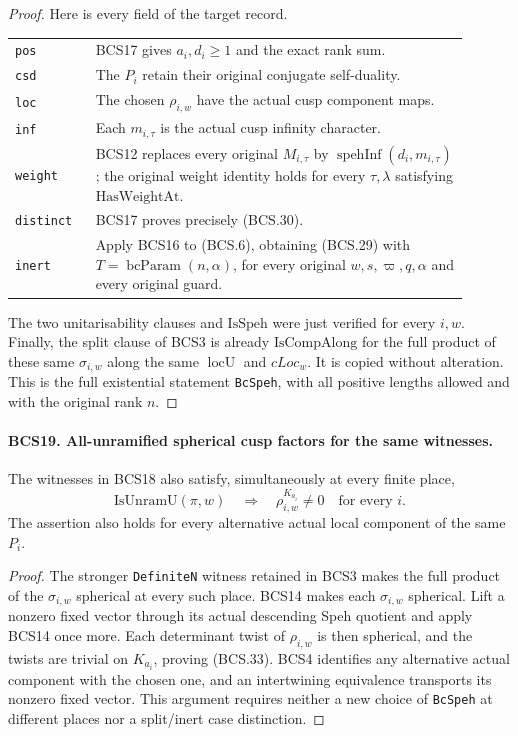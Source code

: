 \begin{proof}
Here is every field of the target record.
\begin{center}
\begin{tabular}{p{0.16\linewidth}p{0.74\linewidth}}
\texttt{pos} & BCS17 gives \(a_i,d_i\ge1\) and the exact rank sum.\\
\texttt{csd} & The \(P_i\) retain their original conjugate self-duality.\\
\texttt{loc} & The chosen \(\rho_{i,w}\) have the actual cusp component maps.\\
\texttt{inf} & Each \(m_{i,\tau}\) is the actual cusp infinity character.\\
\texttt{weight} & BCS12 replaces every original \(M_{i,\tau}\) by
\(\operatorname{spehInf}(d_i,m_{i,\tau})\); the original weight
identity holds for every \(\tau,\lambda\) satisfying
\(\mathrm{HasWeightAt}\).\\
\texttt{distinct} & BCS17 proves precisely (BCS.30).\\
\texttt{inert} & Apply BCS16 to (BCS.6), obtaining (BCS.29) with
\(T=\operatorname{bcParam}(n,\alpha)\), for every original
\(w,s,\varpi,q,\alpha\) and every original guard.\\
\end{tabular}
\end{center}
The two unitarisability clauses and \(\mathrm{IsSpeh}\) were just
verified for every \(i,w\).  Finally, the split clause of BCS3 is
already \(\mathrm{IsCompAlong}\) for the full product of these
same \(\sigma_{i,w}\) along the same \(\operatorname{locU}\)
and \(cLoc_w\).  It is copied without alteration.  This is the
full existential statement \texttt{BcSpeh}, with all positive
lengths allowed and with the original rank \(n\).
\end{proof}

\paragraph{BCS19. All-unramified spherical cusp factors for the same witnesses.}
\label{claim:BCS19}
The witnesses in BCS18 also satisfy, simultaneously at every finite
place,
\[
 \mathrm{IsUnramU}(\pi,w)\quad\Longrightarrow\quad
           \rho_{i,w}^{K_{a_i}}\ne0\quad\text{for every }i.
 \tag{BCS.33}
\]
The assertion also holds for every alternative actual local component
of the same \(P_i\).
\begin{proof}
The stronger \texttt{DefiniteN} witness retained in BCS3 makes the
full product of the \(\sigma_{i,w}\) spherical at every such
place.  BCS14 makes each \(\sigma_{i,w}\) spherical.  Lift a
nonzero fixed vector through its actual descending Speh quotient
and apply BCS14 once more.  Each determinant twist of
\(\rho_{i,w}\) is then spherical, and the twists are trivial on
\(K_{a_i}\), proving (BCS.33).  BCS4 identifies any alternative
actual component with the chosen one, and an intertwining
equivalence transports its nonzero fixed vector.  This argument
requires neither a new choice of \texttt{BcSpeh} at different places
nor a split/inert case distinction.
\end{proof}

